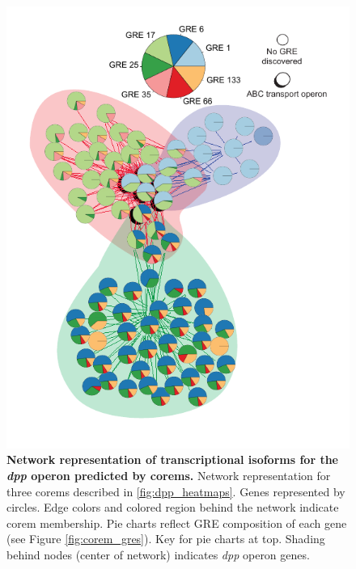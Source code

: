 \begin{figure}[hp]
\centering
\includegraphics[width=0.95\linewidth]{figures/dpp_networks.pdf}
\caption[Network representation of transcriptional isoforms for the \textit{dpp} operon predicted by corems]{\textbf{Network representation of transcriptional isoforms for the \textit{dpp} operon predicted by corems.} Network representation for three corems described in \ref{fig:dpp_heatmaps}. Genes represented by circles. Edge colors and colored region behind the network indicate corem membership. Pie charts reflect GRE composition of each gene (see Figure \ref{fig:corem_gres}). Key for pie charts at top. Shading behind nodes (center of network) indicates \textit{dpp} operon genes.}
\label{fig:dpp_networks}
\end{figure}

